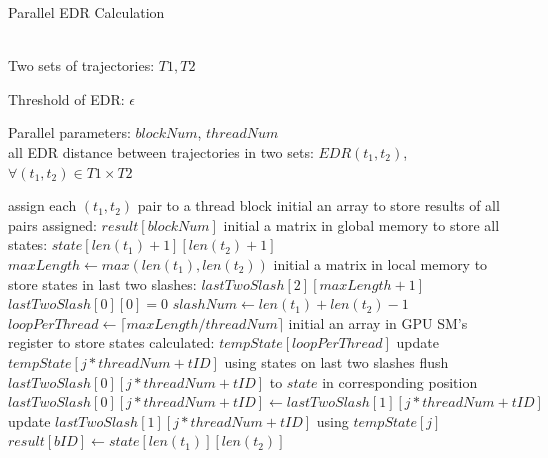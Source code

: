 \documentclass[conference]{IEEEtran}
\begin{document}
\begin{algorithm}[htb]
	\caption{Parallel EDR Calculation}
	\label{alg:EDR}
	\begin{algorithmic}[1]
		\REQUIRE ~~\\
		Two sets of trajectories: $T1,T2$
		
		Threshold of EDR: $\epsilon$
		
		Parallel parameters: $blockNum$, $threadNum$
		\ENSURE ~~\\
		all EDR distance between trajectories in two sets: $EDR(t_{1},t_{2})$, $\forall (t_{1},t_{2})\in T1\times T2$
		
		\STATE assign each $(t_1,t_2)$ pair to a thread block
		\STATE initial an array to store results of all pairs assigned: $result[blockNum]$
			\STATE initial a matrix in global memory to store all states: $state[len(t_1)+1][len(t_2)+1]$
			\STATE $maxLength \leftarrow max(len(t_1),len(t_2))$
			\STATE initial a matrix in local memory to store states in last two slashes: $lastTwoSlash[2][maxLength+1]$
			\STATE $lastTwoSlash[0][0]=0$
			\STATE $slashNum \leftarrow len(t_1)+len(t_2)-1$
			\STATE $loopPerThread \leftarrow \lceil maxLength/threadNum\rceil$
					\STATE initial an array in GPU SM's register to store states calculated: $tempState[loopPerThread]$
						\STATE update $tempState[j*threadNum+tID]$ using states on last two slashes
					\ENDFOR
				\ENDFOR
						\STATE flush $lastTwoSlash[0][j*threadNum+tID]$ to $state$ in corresponding position
						\STATE $lastTwoSlash[0][j*threadNum+tID]\leftarrow lastTwoSlash[1][j*threadNum+tID]$
						\STATE update $lastTwoSlash[1][j*threadNum+tID]$ using $tempState[j]$
					\ENDFOR
				\ENDFOR
			\ENDFOR
			\STATE $result[bID]\leftarrow state[len(t_1)][len(t_2)]$
		\ENDFOR
	\end{algorithmic}
\end{algorithm}
\end{document}

